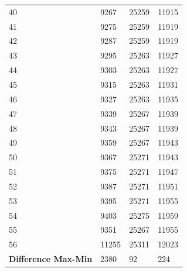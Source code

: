 \documentclass[a4paper,english,12pt,oneside]{article}
\begin{document}
\begin{longtable}{|l|l|l|l|}
40&9267&25259&11915\\
41&9275&25259&11919\\
42&9287&25259&11919\\
43&9295&25263&11927\\
44&9303&25263&11927\\
45&9315&25263&11931\\
46&9327&25263&11935\\
47&9339&25267&11939\\
48&9343&25267&11939\\
49&9359&25267&11943\\
50&9367&25271&11943\\
51&9375&25271&11947\\
52&9387&25271&11951\\
53&9395&25271&11955\\
54&9403&25275&11959\\
55&9351&25267&11955\\
56&11255&25311&12023\\
\hline
\textbf{Difference Max-Min}&2380&92&224\\
\hline 
\end{longtable} 
\end{document}
